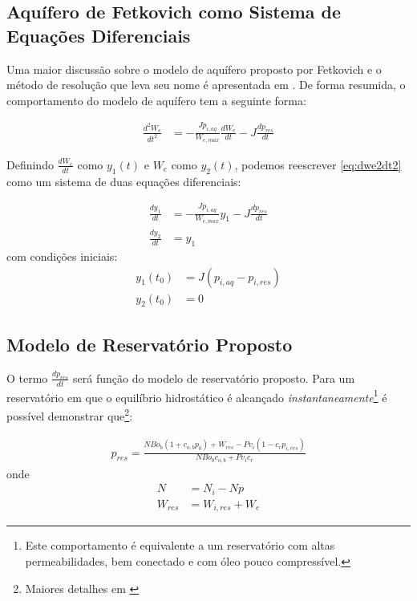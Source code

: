 \documentclass[final,5p]{elsarticle}
\numberwithin{equation}{section}
\begin{document}
    \subsection{Aquífero de Fetkovich como Sistema de Equações Diferenciais}

        Uma maior discussão sobre o modelo de aquífero proposto por Fetkovich e o método de resolução que leva seu nome é apresentada em \cite{relatorioeuler}. De forma resumida, o comportamento do modelo de aquífero tem a seguinte forma:

        \begin{align}
            \frac{d^2W_e}{dt^2} &= - \frac{J p_{i,aq}}{W_{e,max}} \frac{dW_e}{dt} - J \frac{dp_{res}}{dt} \label{eq:dwe2dt2}
        \end{align}

        Definindo $\frac{dW_e}{dt}$ como $y_1(t)$ e $W_e$ como $y_2(t)$, podemos reescrever \ref{eq:dwe2dt2} como um sistema de duas equações diferenciais:

        \begin{align}
            \frac{dy_1}{dt} &= - \frac{J p_{i,aq}}{W_{e,max}} y_1 - J \frac{dp_{res}}{dt} \nonumber \\
            \frac{dy_2}{dt} &= y_1 \label{eq:sistemadwe}
        \end{align}
        \noindent com condições iniciais:
        \begin{align}
            y_1(t_0) &= J (p_{i,aq} - p_{i,res}) \nonumber \\
            y_2(t_0) &= 0 \nonumber
        \end{align}


    \subsection{Modelo de Reservatório Proposto}

        O termo $\frac{dp_{res}}{dt}$ será função do modelo de reservatório proposto. Para um reservatório em que o equilíbrio hidrostático é alcançado \emph{instantaneamente}\footnote{Este comportamento é equivalente a um reservatório com altas permeabilidades, bem conectado e com óleo pouco compressível.} é possível demonstrar que\footnote{Maiores detalhes em \cite{relatorioeuler}}:

        \begin{align}
            p_{res} = \frac{N Bo_b (1+c_{o,b} p_b) + W_{res} - Pv_i (1 - c_r p_{i,res})}
            {N Bo_b c_{o,b} + Pv_i c_r }  \label{eq:pres}
        \end{align}
        \noindent onde
        \begin{align}
            N &= N_i - Np \nonumber \\
            W_{res} &= W_{i,res} + W_e \nonumber
        \end{align}
\end{document}
